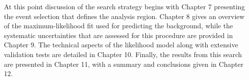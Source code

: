 At this point discussion of the search strategy begins with Chapter 7 presenting the event selection that defines the analysis region.
Chapter 8 gives an overview of the maximum-likelihood fit used for predicting the background, while the systematic uncertainties that are assessed for this procedure are provided in Chapter 9.
The technical aspects of the likelihood model along with extensive validation tests are detailed in Chapter 10.
Finally, the results from this search are presented in Chapter 11, with a summary and conclusions given in Chapter 12.
